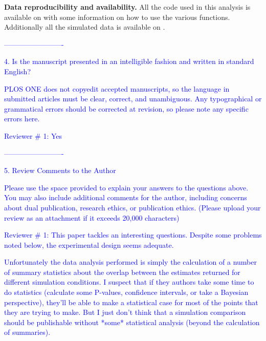 \documentclass[11pt]{letter}
\begin{document}
\begin{letter}{}
\hfill\begin{minipage}{\dimexpr\textwidth-1cm}
\textbf{Data reproducibility and availability.} All the code used in this analysis is available on \href{https://github.com/TGuillerme/Total_Evidence_Method-Missing_data}{\color{blue}{GitHub}} with some information on how to use the various functions. Additionally all the simulated data is available on \href{http://figshare.com/articles/Effect_of_missing_data_on_topological_inference_using_a_total_evidence_approach/1306861}{\color{blue}{FigShare}}.
\end{minipage}

\textcolor{blue}{-------------------------}

\textcolor{blue}{4. Is the manuscript presented in an intelligible fashion and written in standard English?}

\textcolor{blue}{PLOS ONE does not copyedit accepted manuscripts, so the language in submitted articles must be clear, correct, and unambiguous. Any typographical or grammatical errors should be corrected at revision, so please note any specific errors here.}

\textcolor{blue}{Reviewer $\#$ 1: Yes}

\textcolor{blue}{-------------------------}

\textcolor{blue}{5. Review Comments to the Author}

\textcolor{blue}{Please use the space provided to explain your answers to the questions above. You may also include additional comments for the author, including concerns about dual publication, research ethics, or publication ethics. (Please upload your review as an attachment if it exceeds 20,000 characters)}

\textcolor{blue}{Reviewer $\#$ 1: This paper tackles an interesting questions. Despite some problems noted below, the experimental design seems adequate.}


\textcolor{blue}{Unfortunately the data analysis performed is simply the calculation of a number of summary statistics about the overlap between the estimates returned for different simulation conditions. I suspect that if they authors take some time to do statistics (calculate some P-values, confidence intervals, or take a Bayesian perspective), they'll be able to make a statistical case for most of the points that they are trying to make. But I just don't think that a simulation comparison should be publishable without *some* statistical analysis (beyond the calculation of summaries).}


\end{letter}
\end{document}
